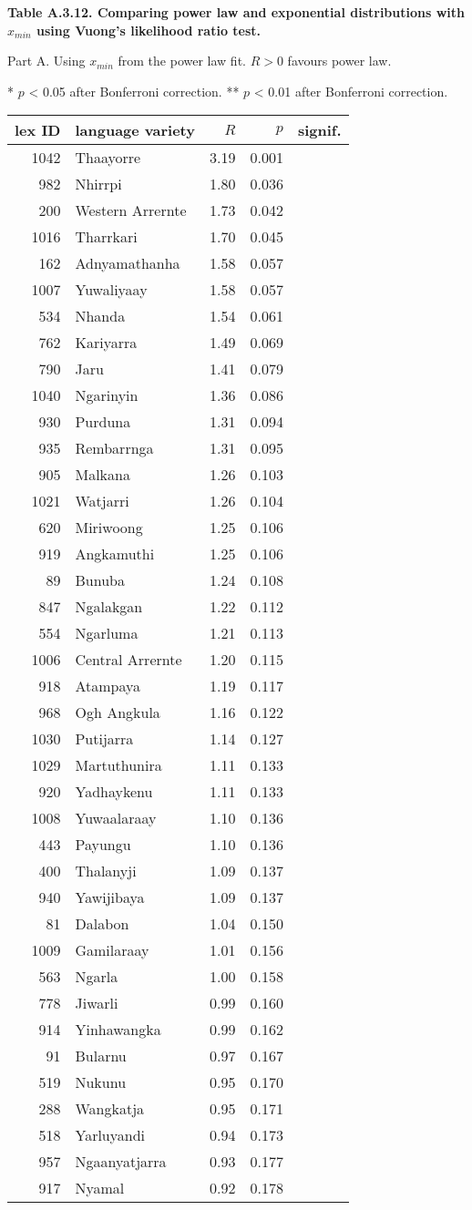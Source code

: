 \newpage

\textbf{Table A.3.12. Comparing power law and exponential distributions
with \(x_{min}\) using Vuong's likelihood ratio test.}

Part A. Using \(x_{min}\) from the power law fit. \(R > 0\) favours
power law.

* \(p\) \textless{} 0.05 after Bonferroni correction. ** \(p\)
\textless{} 0.01 after Bonferroni correction.

\begin{longtable}[]{@{}rlrrl@{}}
\toprule
\textbf{lex ID} & \textbf{language variety} & \(R\) & \(p\) &
\textbf{signif.}\tabularnewline
\midrule
\endhead
1042 & Thaayorre & 3.19 & 0.001 &\tabularnewline
982 & Nhirrpi & 1.80 & 0.036 &\tabularnewline
200 & Western Arrernte & 1.73 & 0.042 &\tabularnewline
1016 & Tharrkari & 1.70 & 0.045 &\tabularnewline
162 & Adnyamathanha & 1.58 & 0.057 &\tabularnewline
1007 & Yuwaliyaay & 1.58 & 0.057 &\tabularnewline
534 & Nhanda & 1.54 & 0.061 &\tabularnewline
762 & Kariyarra & 1.49 & 0.069 &\tabularnewline
790 & Jaru & 1.41 & 0.079 &\tabularnewline
1040 & Ngarinyin & 1.36 & 0.086 &\tabularnewline
930 & Purduna & 1.31 & 0.094 &\tabularnewline
935 & Rembarrnga & 1.31 & 0.095 &\tabularnewline
905 & Malkana & 1.26 & 0.103 &\tabularnewline
1021 & Watjarri & 1.26 & 0.104 &\tabularnewline
620 & Miriwoong & 1.25 & 0.106 &\tabularnewline
919 & Angkamuthi & 1.25 & 0.106 &\tabularnewline
89 & Bunuba & 1.24 & 0.108 &\tabularnewline
847 & Ngalakgan & 1.22 & 0.112 &\tabularnewline
554 & Ngarluma & 1.21 & 0.113 &\tabularnewline
1006 & Central Arrernte & 1.20 & 0.115 &\tabularnewline
918 & Atampaya & 1.19 & 0.117 &\tabularnewline
968 & Ogh Angkula & 1.16 & 0.122 &\tabularnewline
1030 & Putijarra & 1.14 & 0.127 &\tabularnewline
1029 & Martuthunira & 1.11 & 0.133 &\tabularnewline
920 & Yadhaykenu & 1.11 & 0.133 &\tabularnewline
1008 & Yuwaalaraay & 1.10 & 0.136 &\tabularnewline
443 & Payungu & 1.10 & 0.136 &\tabularnewline
400 & Thalanyji & 1.09 & 0.137 &\tabularnewline
940 & Yawijibaya & 1.09 & 0.137 &\tabularnewline
81 & Dalabon & 1.04 & 0.150 &\tabularnewline
1009 & Gamilaraay & 1.01 & 0.156 &\tabularnewline
563 & Ngarla & 1.00 & 0.158 &\tabularnewline
778 & Jiwarli & 0.99 & 0.160 &\tabularnewline
914 & Yinhawangka & 0.99 & 0.162 &\tabularnewline
91 & Bularnu & 0.97 & 0.167 &\tabularnewline
519 & Nukunu & 0.95 & 0.170 &\tabularnewline
288 & Wangkatja & 0.95 & 0.171 &\tabularnewline
518 & Yarluyandi & 0.94 & 0.173 &\tabularnewline
957 & Ngaanyatjarra & 0.93 & 0.177 &\tabularnewline
917 & Nyamal & 0.92 & 0.178 &\tabularnewline

\end{longtable}
